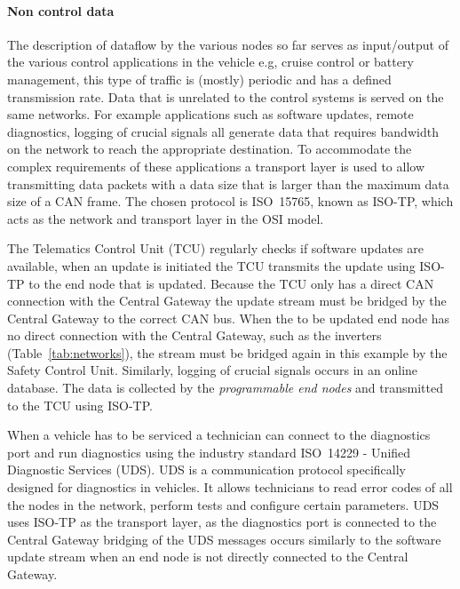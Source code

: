 \paragraph{Non control data}
The description of dataflow by the various nodes so far serves as input/output of the various control applications in the vehicle e.g, cruise control or battery management, this type of traffic is (mostly) periodic and has a defined transmission rate. Data that is unrelated to the control systems is served on the same networks. For example applications such as software updates, remote diagnostics, logging of crucial signals all generate data that requires bandwidth on the network to reach the appropriate destination. To accommodate the complex requirements of these applications a transport layer is used to allow transmitting data packets with a data size that is larger than the maximum data size of a CAN frame. The chosen protocol is ISO~15765, known as ISO-TP, which acts as the network and transport layer in the OSI model.

The Telematics Control Unit (TCU) regularly checks if software updates are available, when an update is initiated the TCU transmits the update using ISO-TP to the end node that is updated. Because the TCU only has a direct CAN connection with the Central Gateway the update stream must be bridged by the Central Gateway to the correct CAN bus. When the to be updated end node has no direct connection with the Central Gateway, such as the inverters (Table~\ref{tab:networks}), the stream must be bridged again in this example by the Safety Control Unit. Similarly, logging of crucial signals occurs in an online database. The data is collected by the \textit{programmable end nodes} and transmitted to the TCU using ISO-TP. 

When a vehicle has to be serviced a technician can connect to the diagnostics port and run diagnostics using the industry standard ISO~14229 - Unified Diagnostic Services (UDS). UDS is a communication protocol specifically designed for diagnostics in vehicles. It allows technicians to read error codes of all the nodes in the network, perform tests and configure certain parameters. UDS uses ISO-TP as the transport layer, as the diagnostics port is connected to the Central Gateway bridging of the UDS messages occurs similarly to the software update stream when an end node is not directly connected to the Central Gateway.

